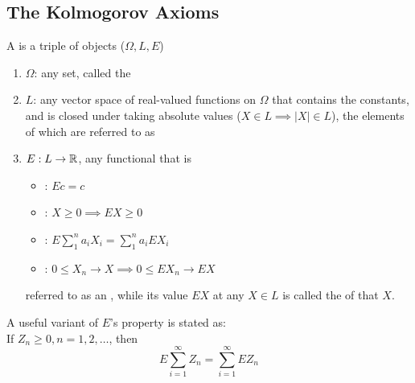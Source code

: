 \documentclass[11pt]{article}
\numberwithin{equation}{section}
\begin{document}
\subsection{The Kolmogorov Axioms}
A  is a triple of objects ($\Omega, L, E$)
\begin{enumerate}
	\item $\Omega$: any set, called the 
	\item $L$: any vector space of real-valued functions on $\Omega$ that contains the constants, and is closed under taking absolute values ($X \in L \implies |X| \in L$), the elements of which are referred to as 
	\item $E: L \rightarrow \mathbb{R}$, any functional that is 
	\begin{itemize}
		\item {}: $Ec = c$
		\item {}: $X \geq 0 \implies EX \geq 0$
		\item {}: $E\sum_1^na_iX_i = \sum_1^na_iEX_i$
		\item {}: $0\leq X_n \rightarrow X \implies 0 \leq EX_n \rightarrow EX$
	\end{itemize}
	referred to as an , while its value $EX$ at any $X \in L$ is called the  of that $X$.
\end{enumerate} 

\property[continuity]
A useful variant of $E$'s  property is stated as:\\
If $Z_n \geq 0, n = 1, 2, \hdots$, then 
\begin{equation}
	E\sum_{i=1}^\infty Z_n = \sum_{i=1}^\infty EZ_n
\end{equation}
\end{document}
